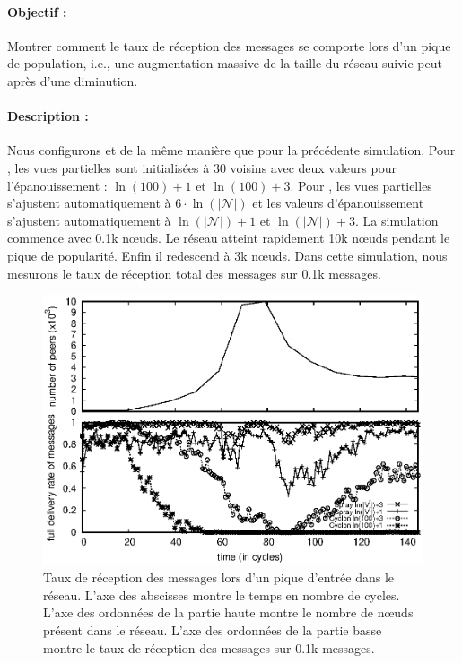 
\paragraph{Objectif :} Montrer comment le taux de réception des messages se
comporte lors d'un pique de population, i.e., une augmentation massive de la
taille du réseau suivie peut après d'une diminution.

\paragraph{Description :} Nous configurons \SPRAY et \CYCLON de la même manière
que pour la précédente simulation. Pour \CYCLON, les vues partielles sont
initialisées à 30 voisins avec deux valeurs pour l'épanouissement : $\ln(100)+1$
et $\ln(100)+3$. Pour \SPRAY, les vues partielles s'ajustent automatiquement à
$6\cdot \ln(|\mathcal{N}|)$ et les valeurs d'épanouissement s'ajustent
automatiquement à $\ln(|\mathcal{N}|)+1$ et $\ln(|\mathcal{N}|)+3$. La
simulation commence avec 0.1k nœuds. Le réseau atteint rapidement 10k nœuds
pendant le pique de popularité. Enfin il redescend à 3k nœuds. Dans cette
simulation, nous mesurons le taux de réception total des messages sur 0.1k
messages.

\begin{figure}
  \begin{center}
    \includegraphics[width=.8\textwidth]{img/spray/peak.eps}
    \caption[Taux de réception des messages lors d'un pique de
    population]{\label{net:fig:peak} Taux de réception des messages lors d'un
      pique d'entrée dans le réseau. L'axe des abscisses montre le temps en
      nombre de cycles. L'axe des ordonnées de la partie haute montre le nombre
      de nœuds présent dans le réseau. L'axe des ordonnées de la partie basse
      montre le taux de réception des messages sur 0.1k messages.}
  \end{center}
\end{figure}


